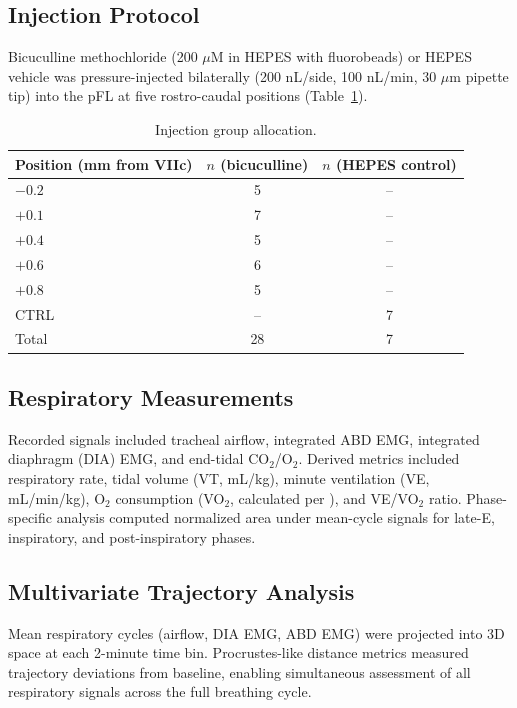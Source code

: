 \documentclass[12pt]{article}
\begin{document}
\subsection{Injection Protocol}

Bicuculline methochloride (200 $\mu$M in HEPES with fluorobeads) or HEPES vehicle was pressure-injected bilaterally (200 nL/side, 100 nL/min, 30 $\mu$m pipette tip) into the pFL at five rostro-caudal positions (Table~\ref{tab:groups}).

\begin{table}[htbp]
\centering
\caption{Injection group allocation.}
\label{tab:groups}
\begin{tabular}{lcc}
\toprule
Position (mm from VIIc) & $n$ (bicuculline) & $n$ (HEPES control) \\
\midrule
$-0.2$ & 5 & -- \\
$+0.1$ & 7 & -- \\
$+0.4$ & 5 & -- \\
$+0.6$ & 6 & -- \\
$+0.8$ & 5 & -- \\
CTRL & -- & 7 \\
Total & 28 & 7 \\
\bottomrule
\end{tabular}
\end{table}

\subsection{Respiratory Measurements}

Recorded signals included tracheal airflow, integrated ABD EMG, integrated diaphragm (DIA) EMG, and end-tidal CO$_2$/O$_2$. Derived metrics included respiratory rate, tidal volume (VT, mL/kg), minute ventilation (VE, mL/min/kg), O$_2$ consumption (VO$_2$, calculated per \citealt{depocas1957metabolic}), and VE/VO$_2$ ratio. Phase-specific analysis computed normalized area under mean-cycle signals for late-E, inspiratory, and post-inspiratory phases.

\subsection{Multivariate Trajectory Analysis}

Mean respiratory cycles (airflow, DIA EMG, ABD EMG) were projected into 3D space at each 2-minute time bin. Procrustes-like distance metrics measured trajectory deviations from baseline, enabling simultaneous assessment of all respiratory signals across the full breathing cycle.
\end{document}
